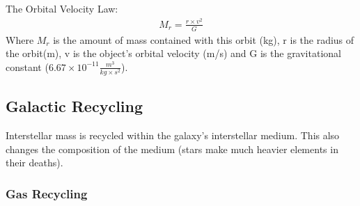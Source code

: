The Orbital Velocity Law:\\
\begin{align*}
M_r = \frac{r \times v^2}{G}
\end{align*}
Where $M_r$ is the amount of mass contained with this orbit (kg), r is the radius of the orbit(m), v is the object's orbital velocity (m/s) and G is the gravitational constant ($6.67\times 10^{-11} \frac{m^3}{kg \times s^2}$).

\subsection{Galactic Recycling}
Interstellar mass is recycled within the galaxy's interstellar medium. This also changes the composition of the medium (stars make much heavier elements in their deaths).

\subsubsection{Gas Recycling}

